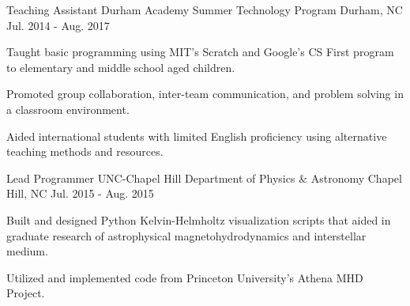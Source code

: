 

\begin{cventries}

  \cventry
    {Teaching Assistant} %
    {Durham Academy Summer Technology Program} %
    {Durham, NC} %
    {Jul. 2014 - Aug. 2017} %
    {
      \begin{cvitems} %
        \item {Taught basic programming using MIT's Scratch and Google's CS First program to elementary and middle school aged children.}
        \item {Promoted group collaboration, inter-team communication, and problem solving in a classroom environment.}
        \item {Aided international students with limited English proficiency using alternative teaching methods and resources.}
      \end{cvitems}
    }

  \cventry
    {Lead Programmer} %
    {UNC-Chapel Hill Department of Physics \& Astronomy} %
    {Chapel Hill, NC} %
    {Jul. 2015 - Aug. 2015} %
    {
      \begin{cvitems} %
        \item {Built and designed Python Kelvin-Helmholtz visualization scripts that aided in graduate research of astrophysical magnetohydrodynamics and interstellar medium.}
        \item {Utilized and implemented code from Princeton University's Athena MHD Project.}
      \end{cvitems}
    }


\end{cventries}
